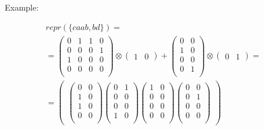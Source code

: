 \documentclass[leqno]{article}
\begin{document}
Example:

\begin{multline}
    repr(\{caab, bd\}) = \\
    =
    \begin{pmatrix}
    0 & 1 & 1 & 0 \\
    0 & 0 & 0 & 1 \\
    1 & 0 & 0 & 0 \\
    0 & 0 & 0 & 0 \\
    \end{pmatrix}
    \otimes
    \begin{pmatrix} 1 & 0 \end{pmatrix}
    +
    \begin{pmatrix}
    0 & 0 \\
    1 & 0 \\
    0 & 0 \\
    0 & 1 \\
    \end{pmatrix}
    \otimes
    \begin{pmatrix} 0 & 1 \end{pmatrix} = \\
    =
    \begin{pmatrix}
    \begin{pmatrix}
    0 & 0 \\
    1 & 0 \\
    1 & 0 \\
    0 & 0 \\
    \end{pmatrix}
    \begin{pmatrix}
    0 & 1 \\
    0 & 0 \\
    0 & 0 \\
    1 & 0 \\
    \end{pmatrix}
    \begin{pmatrix}
    1 & 0 \\
    0 & 0 \\
    0 & 0 \\
    0 & 0 \\
    \end{pmatrix}
    \begin{pmatrix}
    0 & 0 \\
    0 & 1 \\
    0 & 0 \\
    0 & 0 \\
    \end{pmatrix}
    \end{pmatrix}
\end{multline}
\end{document}
